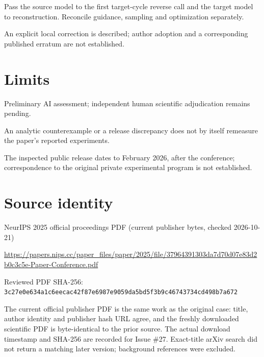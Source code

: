 \documentclass[11pt]{article}
\begin{document}
Pass the source model to the first target-cycle reverse call and the target model to reconstruction. Reconcile guidance, sampling and optimization separately.

An explicit local correction is described; author adoption and a corresponding published erratum are not established.

\section*{Limits}

Preliminary AI assessment; independent human scientific adjudication remains pending.\par

An analytic counterexample or a release discrepancy does not by itself remeasure the paper’s reported experiments.\par

The inspected public release dates to February 2026, after the conference; correspondence to the original private experimental program is not established.\par

\section*{Source identity}

NeurIPS 2025 official proceedings PDF (current publisher bytes, checked 2026-10-21)

\url{https://papers.nips.cc/paper_files/paper/2025/file/37964391303da7d70d07e83d2b0c3c5e-Paper-Conference.pdf}

Reviewed PDF SHA-256: \nolinkurl{3c27e0e634a1c6eecac42f87e6987e9059da5bd5f3b9c46743734cd498b7a672}

The current official publisher PDF is the same work as the original case: title, author identity and publisher hash URL agree, and the freshly downloaded scientific PDF is byte-identical to the prior source. The actual download timestamp and SHA-256 are recorded for Issue \#27. Exact-title arXiv search did not return a matching later version; background references were excluded.
\end{document}
